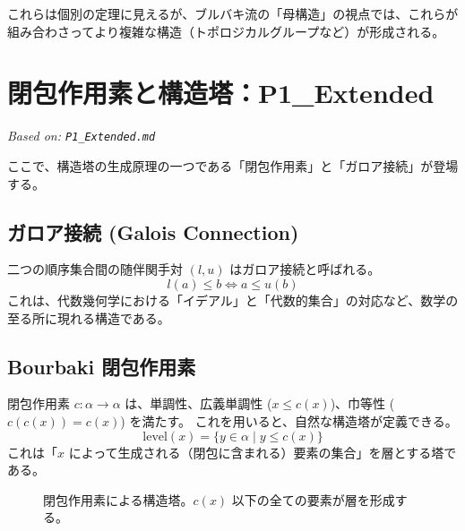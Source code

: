 \documentclass[a4paper,11pt]{ltjsarticle}
\theoremstyle{definition}
\begin{document}
これらは個別の定理に見えるが、ブルバキ流の「母構造」の視点では、これらが組み合わさってより複雑な構造（トポロジカルグループなど）が形成される。

\section{閉包作用素と構造塔：P1\_Extended}
\label{sec:p1_extended}
\textit{Based on: \texttt{P1\_Extended.md}}

ここで、構造塔の生成原理の一つである「閉包作用素」と「ガロア接続」が登場する。

\subsection{ガロア接続 (Galois Connection)}
二つの順序集合間の随伴関手対 $(l, u)$ はガロア接続と呼ばれる。
\[ l(a) \le b \iff a \le u(b) \]
これは、代数幾何学における「イデアル」と「代数的集合」の対応など、数学の至る所に現れる構造である。

\subsection{Bourbaki 閉包作用素}
閉包作用素 $c: \alpha \to \alpha$ は、単調性、広義単調性 ($x \le c(x)$)、巾等性 ($c(c(x)) = c(x)$) を満たす。
これを用いると、自然な構造塔が定義できる。
\[ \mathrm{level}(x) = \{y \in \alpha \mid y \le c(x)\} \]
これは「$x$ によって生成される（閉包に含まれる）要素の集合」を層とする塔である。

\begin{figure}[h]
\centering
{}
\caption{閉包作用素による構造塔。$c(x)$ 以下の全ての要素が層を形成する。}
\end{figure}
\end{document}
